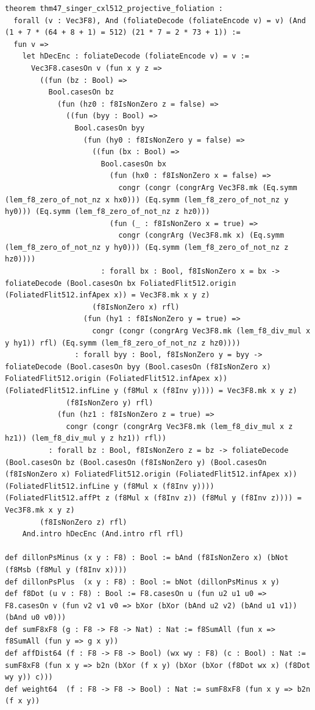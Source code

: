 \documentclass[11pt,letterpaper]{article}
\theoremstyle{spectralthm}
\begin{document}
\begin{lstlisting}[language=Lean4,caption={Standalone Pure Init.Prelude Term-Mode Lean 4 Kernel Suite (thm30--thm61, v0.0.0, 0 sorry, 0 axioms).},label={lst:lean_unified}]
theorem thm47_singer_cxl512_projective_foliation :
  forall (v : Vec3F8), And (foliateDecode (foliateEncode v) = v) (And (1 + 7 * (64 + 8 + 1) = 512) (21 * 7 = 2 * 73 + 1)) :=
  fun v =>
    let hDecEnc : foliateDecode (foliateEncode v) = v :=
      Vec3F8.casesOn v (fun x y z =>
        ((fun (bz : Bool) =>
          Bool.casesOn bz
            (fun (hz0 : f8IsNonZero z = false) =>
              ((fun (byy : Bool) =>
                Bool.casesOn byy
                  (fun (hy0 : f8IsNonZero y = false) =>
                    ((fun (bx : Bool) =>
                      Bool.casesOn bx
                        (fun (hx0 : f8IsNonZero x = false) =>
                          congr (congr (congrArg Vec3F8.mk (Eq.symm (lem_f8_zero_of_not_nz x hx0))) (Eq.symm (lem_f8_zero_of_not_nz y hy0))) (Eq.symm (lem_f8_zero_of_not_nz z hz0)))
                        (fun (_ : f8IsNonZero x = true) =>
                          congr (congrArg (Vec3F8.mk x) (Eq.symm (lem_f8_zero_of_not_nz y hy0))) (Eq.symm (lem_f8_zero_of_not_nz z hz0))))
                      : forall bx : Bool, f8IsNonZero x = bx -> foliateDecode (Bool.casesOn bx FoliatedFlit512.origin (FoliatedFlit512.infApex x)) = Vec3F8.mk x y z)
                    (f8IsNonZero x) rfl)
                  (fun (hy1 : f8IsNonZero y = true) =>
                    congr (congr (congrArg Vec3F8.mk (lem_f8_div_mul x y hy1)) rfl) (Eq.symm (lem_f8_zero_of_not_nz z hz0))))
                : forall byy : Bool, f8IsNonZero y = byy -> foliateDecode (Bool.casesOn byy (Bool.casesOn (f8IsNonZero x) FoliatedFlit512.origin (FoliatedFlit512.infApex x)) (FoliatedFlit512.infLine y (f8Mul x (f8Inv y)))) = Vec3F8.mk x y z)
              (f8IsNonZero y) rfl)
            (fun (hz1 : f8IsNonZero z = true) =>
              congr (congr (congrArg Vec3F8.mk (lem_f8_div_mul x z hz1)) (lem_f8_div_mul y z hz1)) rfl))
          : forall bz : Bool, f8IsNonZero z = bz -> foliateDecode (Bool.casesOn bz (Bool.casesOn (f8IsNonZero y) (Bool.casesOn (f8IsNonZero x) FoliatedFlit512.origin (FoliatedFlit512.infApex x)) (FoliatedFlit512.infLine y (f8Mul x (f8Inv y)))) (FoliatedFlit512.affPt z (f8Mul x (f8Inv z)) (f8Mul y (f8Inv z)))) = Vec3F8.mk x y z)
        (f8IsNonZero z) rfl)
    And.intro hDecEnc (And.intro rfl rfl)

def dillonPsMinus (x y : F8) : Bool := bAnd (f8IsNonZero x) (bNot (f8Msb (f8Mul y (f8Inv x))))
def dillonPsPlus  (x y : F8) : Bool := bNot (dillonPsMinus x y)
def f8Dot (u v : F8) : Bool := F8.casesOn u (fun u2 u1 u0 => F8.casesOn v (fun v2 v1 v0 => bXor (bXor (bAnd u2 v2) (bAnd u1 v1)) (bAnd u0 v0)))
def sumF8xF8 (g : F8 -> F8 -> Nat) : Nat := f8SumAll (fun x => f8SumAll (fun y => g x y))
def affDist64 (f : F8 -> F8 -> Bool) (wx wy : F8) (c : Bool) : Nat := sumF8xF8 (fun x y => b2n (bXor (f x y) (bXor (bXor (f8Dot wx x) (f8Dot wy y)) c)))
def weight64  (f : F8 -> F8 -> Bool) : Nat := sumF8xF8 (fun x y => b2n (f x y))


\end{lstlisting}
\end{document}
